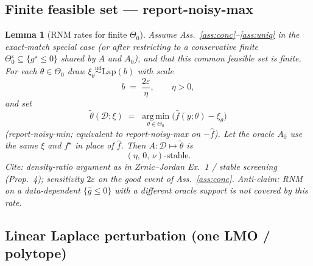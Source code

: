 \documentclass[11pt]{article}
\newtheorem{lemma}{Lemma}
\begin{document}
\subsection{Finite feasible set --- report-noisy-max}

\begin{lemma}[RNM rates for finite $\Theta_0$]
\label{lem:rnm}
Assume Ass.~\ref{ass:conc}--\ref{ass:uniq} in the \emph{exact-match} special case
(or after restricting to a conservative finite $\Theta_0^\varepsilon\subseteq\{g^\star\le 0\}$
shared by $A$ and $A_0$), and that this common feasible set is finite.
For each $\theta\in\Theta_0$ draw $\xi_\theta\stackrel{\mathrm{iid}}{\sim}\mathrm{Lap}(b)$ with scale
\begin{equation}
\label{eq:rnm-scale}
b \;=\; \frac{2\varepsilon}{\eta},\qquad \eta>0,
\end{equation}
and set
\[
\tilde\theta(\mathcal{D};\xi)
\;=\;
\operatorname*{arg\,min}_{\theta\in\Theta_0}
\bigl(\hat f(y;\theta)-\xi_\theta\bigr)
\]
(report-noisy-min; equivalent to report-noisy-max on $-\hat f$).
Let the oracle $A_0$ use the \emph{same} $\xi$ and $f^\star$ in place of $\hat f$.
Then $A:\mathcal{D}\mapsto\tilde\theta$ is
\begin{equation}
\label{eq:rnm-rate}
(\eta,\,0,\,\nu)\text{-stable}.
\end{equation}
\textit{Cite:} density-ratio argument as in Zrnic--Jordan Ex.~1 / stable screening (Prop.~4);
sensitivity $2\varepsilon$ on the good event of Ass.~\ref{ass:conc}.
\textit{Anti-claim:} RNM on a data-dependent $\{\hat g\le 0\}$ with a different oracle support
is not covered by this rate.
\end{lemma}

\subsection{Linear Laplace perturbation (one LMO / polytope)}
\end{document}
